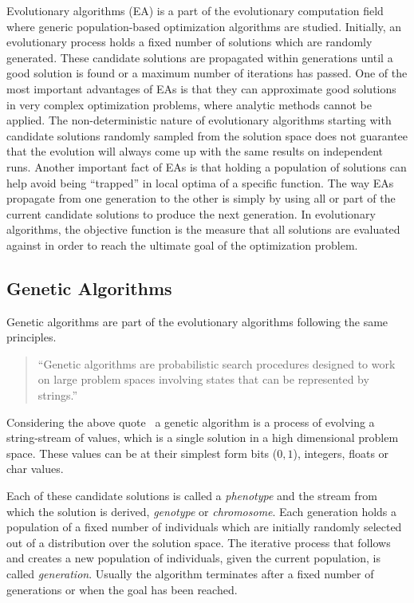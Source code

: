 Evolutionary algorithms (EA) is a part of the evolutionary computation field where generic population-based optimization algorithms are studied. Initially, an evolutionary process holds a fixed number of solutions which are randomly generated. These candidate solutions are propagated within generations until a good solution is found or a maximum number of iterations has passed. One of the most important advantages of EAs is that they can approximate good solutions in very complex optimization problems, where analytic methods cannot be applied. The non-deterministic nature of evolutionary algorithms starting with candidate solutions randomly sampled from the solution space does not guarantee that the evolution will always come up with the same results on independent runs. Another important fact of EAs is that holding a population of solutions can help avoid being ``trapped'' in local optima of a specific function. The way EAs propagate from one generation to the other is simply by using all or part of the current candidate solutions to produce the next generation. In evolutionary algorithms, the objective function is the measure that all solutions are evaluated against in order to reach the ultimate goal of the optimization problem.




\subsection{Genetic Algorithms}
\label{geneticAlgorithms}
Genetic algorithms are part of the evolutionary algorithms following the same principles.

\begin{quote}``Genetic algorithms are probabilistic search procedures designed to work on
large problem spaces involving states that can be represented by strings.''\end{quote}

Considering the above quote~\citep{goldberg1988genetic} a genetic algorithm is a process of evolving a string-stream of values, which is a single solution in a high dimensional problem space. These values can be at their simplest form bits ($0, 1$), integers, floats or char values.

Each of these candidate solutions is called a \emph{phenotype} and the stream from which the solution is derived, \emph{genotype} or \emph{chromosome}. Each generation holds a population of a fixed number of individuals which are initially randomly selected out of a distribution over the solution space. The iterative process that follows and creates a new population of individuals, given the current population, is called \emph{generation}. Usually the algorithm terminates after a fixed number of generations or when the goal has been reached. 

